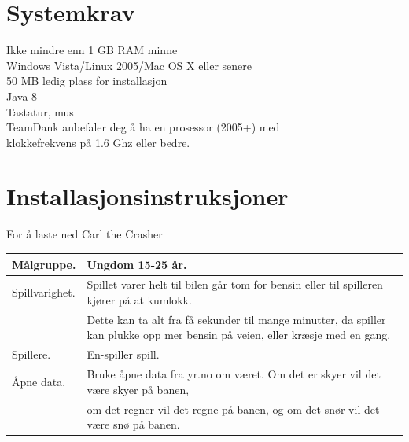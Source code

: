 \documentclass[paper=a4]{article}
\begin{document}
\section{Systemkrav}
Ikke mindre enn 1 GB RAM minne\\
Windows Vista/Linux 2005/Mac OS X eller senere \\
50 MB ledig plass for installasjon \\
Java 8 \\
Tastatur, mus \\
TeamDank anbefaler deg å ha en prosessor (2005+) med \\ 
klokkefrekvens på 1.6 Ghz eller bedre.
\newpage

\section{Installasjonsinstruksjoner} 
For å laste ned Carl the Crasher 
\newpage

\begin{center}
\begin{tabular}{ | m{5cm} | m{8cm} | }
\hline
Målgruppe. & Ungdom 15-25 år. \\ \hline
Spillvarighet. & Spillet varer helt til bilen går tom for bensin eller til spilleren kjører på at kumlokk.\\&
Dette kan ta alt fra få sekunder til mange minutter, da spiller kan plukke opp mer bensin på veien, eller kræsje med en gang.\\ \hline
Spillere. & En-spiller spill. \\ \hline
Åpne data. & Bruke åpne data fra yr.no om været. Om det er skyer vil det være skyer på banen,\\&
om det regner vil det regne på banen, og om det snør vil det være snø på banen.\\ \hline
\end{tabular}
\end{center}
\end{document}
